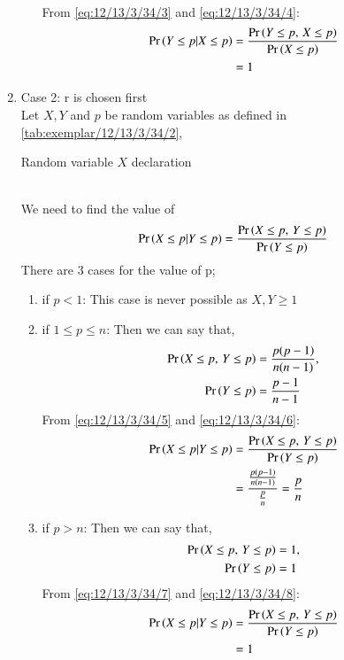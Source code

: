 \documentclass[article]{IEEEtran}
\theoremstyle{remark}
\begin{document}
\begin{enumerate}
\begin{enumerate}
\begin{align}
\end{align}
From \eqref{eq:12/13/3/34/3} and \eqref{eq:12/13/3/34/4}:
\begin{align}
\Pr\left(Y\le p|X\le p\right) &= \frac{\Pr\left(Y \le p, \, X \le p\right)}{\Pr\left(X \le p\right)}\\
&= 1 
\end{align}
\end{enumerate}
\item Case 2: r is chosen first
\\Let $X,Y$ and $p$ be random variables as defined in  \autoref{tab:exemplar/12/13/3/34/2},
\begin{table}[h]
	\centering
	
	\caption{Random variable $X$ declaration}
        \label{tab:exemplar/12/13/3/34/2}
\end{table}
\\We need to find the value of
\begin{align}
\Pr\left(X\le p|Y\le p\right) = \frac{\Pr\left(X \le p, \, Y \le p\right)}{\Pr\left(Y \le p\right)}
\end{align}
There are 3 cases for the value of p;
\begin{enumerate}
\item if $p<1$:
This case is never possible as $X,Y \ge 1$
\item if $1 \le p \le n$:
Then we can say that,
\begin{align}
\Pr\left(X \le p, \, Y \le p\right) &= \frac{p(p-1)}{n(n-1)} \label{eq:12/13/3/34/5},\\
\Pr\left(Y \le p\right) &= \frac{p-1}{n-1} \label{eq:12/13/3/34/6}
\end{align}
From \eqref{eq:12/13/3/34/5} and \eqref{eq:12/13/3/34/6}:
\begin{align}
\Pr\left(X\le p|Y\le p\right) &= \frac{\Pr\left(X \le p, \, Y \le p\right)}{\Pr\left(Y \le p\right)}\\
&= \frac{\frac{p(p-1)}{n(n-1)}}{\frac{p}{n}}
=\frac{p}{n}
\end{align}
\item if $p>n$:
Then we can say that,
\begin{align}
\Pr\left(X \le p, \, Y \le p\right) &= 1 \label{eq:12/13/3/34/7},\\
\Pr\left(Y \le p\right) &= 1 \label{eq:12/13/3/34/8}
\end{align}
From \eqref{eq:12/13/3/34/7} and \eqref{eq:12/13/3/34/8}:
\begin{align}
\Pr\left(X\le p|Y\le p\right) &= \frac{\Pr\left(X \le p, \, Y \le p\right)}{\Pr\left(Y \le p\right)}\\
&= 1 
\end{align}
\end{enumerate}
\end{enumerate}
\end{document}
